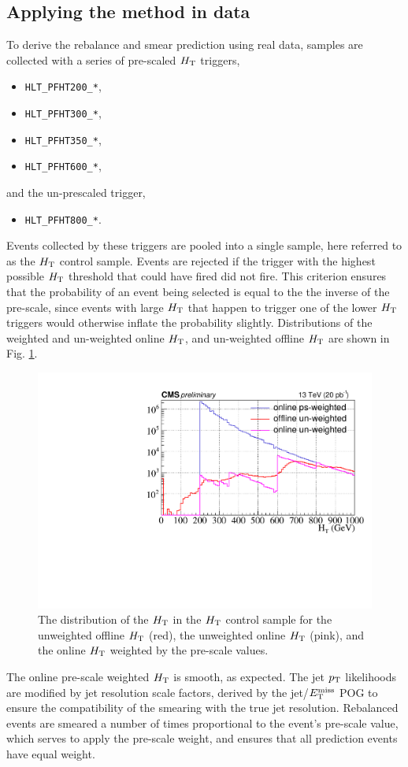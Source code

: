 \subsection{Applying the method in data}
To derive the rebalance and smear prediction using real data, samples are collected with a series of pre-scaled $H_{\rm T}$ triggers,
\begin{itemize}
  \item \texttt{HLT\_PFHT200\_*},
    \item \texttt{HLT\_PFHT300\_*},
      \item \texttt{HLT\_PFHT350\_*},
        \item \texttt{HLT\_PFHT600\_*},
\end{itemize}
and the un-prescaled trigger,
\begin{itemize}
  \item \texttt{HLT\_PFHT800\_*}.
\end{itemize}
Events collected by these triggers are pooled into a single sample, here referred to as the $H_{\rm T}$ control sample. Events are rejected if the trigger with the highest possible $H_{\rm T}$ threshold that could have fired did not fire. This criterion ensures that the probability of an event being selected is equal to the the inverse of the pre-scale, since events with large $H_{\rm T}$ that happen to trigger one of the lower $H_{\rm T}$ triggers would otherwise inflate the probability slightly. Distributions of the weighted and un-weighted online $H_{\rm T}$, and un-weighted offline $H_{\rm T}$ are shown in Fig. \ref{fig:PrescaleWeights}.
\begin{figure}[tb!]
\centering
\includegraphics[width=0.6\linewidth]{figures/SusySearches/Ra2b2016/PrescaleWeightsHT2.pdf}
\caption{The distribution of the $H_{\rm T}$ in the $H_{\rm T}$ control sample for the unweighted offline $H_{\rm T}$ (red), the unweighted online $H_{\rm T}$ (pink), and the online $H_{\rm T}$ weighted by the pre-scale values.}
\label{fig:PrescaleWeights}
\end{figure}
The online pre-scale weighted $H_{\rm T}$ is smooth, as expected. The jet $p_{\text{T}}$ likelihoods are modified by jet resolution scale factors, derived by the jet/$E_{\text{T}}^{\rm miss}$ POG \cite{jetmet2} to ensure the compatibility of the smearing with the true jet resolution. Rebalanced events are smeared a number of times proportional to the event's pre-scale value, which serves to apply the pre-scale weight, and ensures that all prediction events have equal weight.

